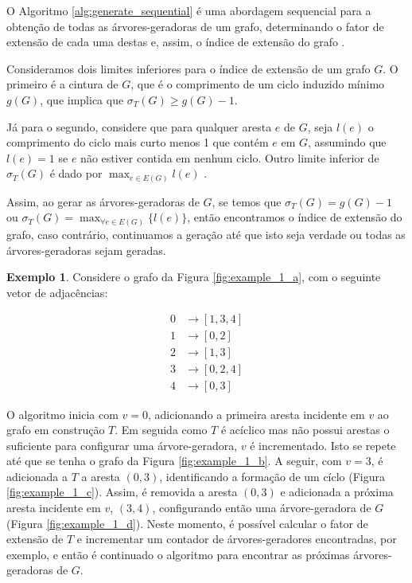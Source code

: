 \documentclass[article,a4paper,12pt,brazil,sumario=tradicional]{abntex2}
\theoremstyle{definition} %
\newtheorem{example}{Exemplo}
\begin{document}
O Algoritmo \ref{alg:generate_sequential} é uma abordagem sequencial para a obtenção de todas as árvores-geradoras de um grafo, determinando o fator de extensão de cada uma destas e, assim, o índice de extensão do grafo \cite{COUTO2022106265}.

Consideramos dois limites inferiores para o índice de extensão de um grafo $G$. O primeiro é a cintura de $G$, que é o comprimento de um ciclo induzido mínimo $g(G)$, que implica que $\sigma_T(G) \geq g(G) - 1$.

Já para o segundo, considere que para qualquer aresta $e$ de $G$, seja $l(e)$ o comprimento do ciclo mais curto menos 1 que contém $e$ em $G$, assumindo que $l(e) = 1$ se $e$ não estiver contida em nenhum ciclo. Outro limite inferior de $\sigma_T(G)$ é dado por $\max_{e \in E(G)} l(e)$ \cite{COUTO2022106265}.

Assim, ao gerar as árvores-geradoras de $G$, se temos que $\sigma_T(G) = g(G) - 1$ ou $\sigma_T(G) = \max_{\forall e \in E(G)} \{ l(e) \}$, então encontramos o índice de extensão do grafo, caso contrário, continuamos a geração até que isto seja verdade ou todas as árvores-geradoras sejam geradas.





\newpage

\begin{example}

Considere o grafo da Figura \ref{fig:example_1_a}, com o seguinte vetor de adjacências:

\begin{equation*}
\begin{aligned}
0 &\rightarrow [1, 3, 4] \\
1 &\rightarrow [0, 2] \\
2 &\rightarrow [1, 3] \\
3 &\rightarrow [0, 2, 4] \\
4 &\rightarrow [0, 3]
\end{aligned}
\end{equation*}

O algoritmo inicia com $v = 0$, adicionando a primeira aresta incidente em $v$ ao grafo em construção $T$. Em seguida como $T$ é acíclico mas não possui arestas o suficiente para configurar uma árvore-geradora, $v$ é incrementado. Isto se repete até que se tenha o grafo da Figura \ref{fig:example_1_b}. A seguir, com $v = 3$, é adicionada a $T$ a aresta $(0,3)$, identificando a formação de um cíclo (Figura \ref{fig:example_1_c}). Assim, é removida a aresta $(0,3)$ e adicionada a próxima aresta incidente em $v$, $(3,4)$, configurando então uma árvore-geradora de $G$ (Figura \ref{fig:example_1_d}). Neste momento, é possível calcular o fator de extensão de $T$ e incrementar um contador de árvores-geradores encontradas, por exemplo, e então é continuado o algoritmo para encontrar as próximas árvores-geradoras de $G$.

\end{example}
\end{document}
